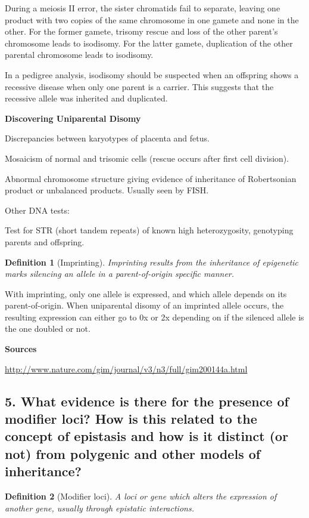 \documentclass{tufte-handout}
\theoremstyle{noparens}
\newtheorem*{define}{Definition}
\begin{document}
During a meiosis II error, the sister chromatids fail to separate, leaving one product with two copies of the same chromosome in one gamete and none in the other. For the former gamete, trisomy rescue and loss of the other parent's chromosome leads to isodisomy. For the latter gamete, duplication of the other parental chromosome leads to isodisomy.

In a pedigree analysis, isodisomy should be suspected when an offspring shows a recessive disease when only one parent is a carrier. This suggests that the recessive allele was inherited and duplicated.
 
 \textbf{Discovering Uniparental Disomy}
 
 Discrepancies between karyotypes of placenta and fetus.
 
 Mosaicism of normal and trisomic cells (rescue occurs after first cell division).
 
 Abnormal chromosome structure giving evidence of inheritance of Robertsonian product or unbalanced products. Usually seen by FISH.
 
 Other DNA tests:
 
 Test for STR (short tandem repeats) of known high heterozygosity, genotyping parents and offspring. 

\begin{define}[Imprinting]
Imprinting results from the inheritance of epigenetic marks silencing an allele in a parent-of-origin specific manner.
\end{define}

With imprinting, only one allele is expressed, and which allele depends on its parent-of-origin. When uniparental disomy of an imprinted allele occurs, the resulting expression can either go to 0x or 2x depending on if the silenced allele is the one doubled or not.

 \textbf{Sources}
 
 \url{http://www.nature.com/gim/journal/v3/n3/full/gim200144a.html}
 
\newpage
\subsection{5. What evidence is there for the presence of modifier loci? How is this related to the concept of epistasis and how is it distinct (or not) from polygenic and other models of inheritance?}
\label{subsec:05}

\begin{define}[Modifier loci]
A loci or gene which alters the expression of another gene, usually through epistatic interactions.
\end{define}
\end{document}
